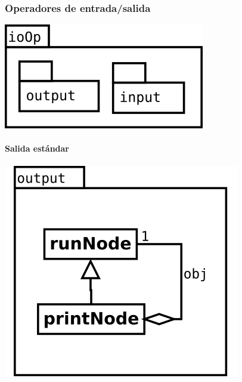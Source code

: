 \pagebreak
\subsubsection {Operadores de entrada/salida} 
\begin{center}
\includegraphics[scale=0.4]{ioOp-package.png} \\
\end{center}
\paragraph {Salida estándar} 
\begin{center}
\includegraphics[scale=0.4]{output.png} \\
\end{center}
